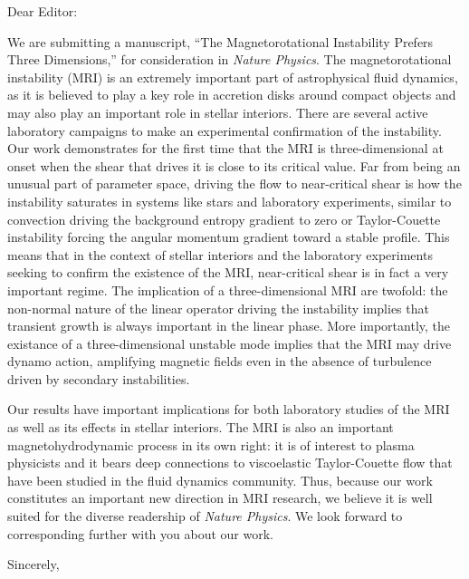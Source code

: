 \documentclass{letter}
\begin{document}
\begin{letter}{}
  \opening{Dear Editor:}

  We are submitting a manuscript, ``The Magnetorotational Instability Prefers Three Dimensions,'' for consideration in \emph{Nature Physics}.
The magnetorotational instability (MRI) is an extremely important part of astrophysical fluid dynamics, as it is believed to play a key role in accretion disks around compact objects and may also play an important role in stellar interiors.
There are several active laboratory campaigns to make an experimental confirmation of the instability.
Our work demonstrates for the first time that the MRI is three-dimensional at onset when the shear that drives it is close to its critical value.
Far from being an unusual part of parameter space, driving the flow to near-critical shear is how the instability saturates in systems like stars and laboratory experiments, similar to convection driving the background entropy gradient to zero or Taylor-Couette instability forcing the angular momentum gradient toward a stable profile.
This means that in the context of stellar interiors and the laboratory experiments seeking to confirm the existence of the MRI, near-critical shear is in fact a very important regime.
The implication of a three-dimensional MRI are twofold: the non-normal nature of the linear operator driving the instability implies that transient growth is always important in the linear phase.
More importantly, the existance of a three-dimensional unstable mode implies that the MRI may drive dynamo action, amplifying magnetic fields even in the absence of turbulence driven by secondary instabilities.

Our results have important implications for both laboratory studies of the MRI as well as its effects in stellar interiors. 
The MRI is also an important magnetohydrodynamic process in its own right: it is of interest to plasma physicists and it bears deep connections to viscoelastic Taylor-Couette flow that have been studied in the fluid dynamics community. 
Thus, because our work constitutes an important new direction in MRI research, we believe it is well suited for the diverse readership of \emph{Nature Physics}. We look forward to corresponding further with you about our work.

\closing{Sincerely, \\
\\
}

\end{letter}
\end{document}
